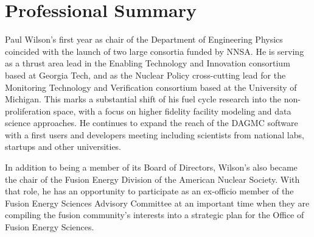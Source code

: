 \section{Professional Summary}

Paul Wilson's first year as chair of the Department of Engineering Physics
coincided with the launch of two large consortia funded by NNSA.  He is serving
as a thrust area lead in the Enabling Technology and Innovation consortium based
at Georgia Tech, and as the Nuclear Policy cross-cutting lead for the Monitoring
Technology and Verification consortium based at the University of Michigan. This
marks a substantial shift of his fuel cycle research into the non-proliferation
space, with a focus on higher fidelity facility modeling and data science
approaches.  He continues to expand the reach of the DAGMC software with a first
users and developers meeting including scientists from national labs, startups
and other universities. 

In addition to being a member of its Board of Directors, Wilson's also became
the chair of the Fusion Energy Division of the American Nuclear Society.  With
that role, he has an opportunity to participate as an ex-officio member of the
Fusion Energy Sciences Advisory Committee at an important time when they are
compiling the fusion community's interests into a strategic plan for the Office
of Fusion Energy Sciences.